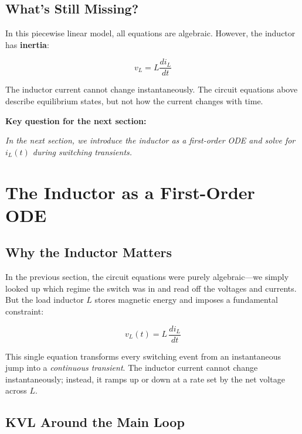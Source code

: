 \documentclass[11pt, a4paper]{article}
\begin{document}
\subsection{What's Still Missing?}

In this piecewise linear model, all equations are algebraic. However, the inductor has \textbf{inertia}:

\[
    v_L = L \frac{di_L}{dt}
\]

The inductor current cannot change instantaneously. The circuit equations above describe equilibrium states, but not how the current changes with time.

\vspace{1em}
\noindent\textbf{Key question for the next section:}


\vspace{1em}
\noindent\textit{In the next section, we introduce the inductor as a first-order ODE and solve for $i_L(t)$ during switching transients.}

\section{The Inductor as a First-Order ODE}

\subsection{Why the Inductor Matters}

In the previous section, the circuit equations were purely algebraic—we simply looked up which regime the switch was in and read off the voltages and currents. But the load inductor $L$ stores magnetic energy and imposes a fundamental constraint:

\[
    v_L(t) = L\,\frac{di_L}{dt}
\]

This single equation transforms every switching event from an instantaneous jump into a \emph{continuous transient}. The inductor current cannot change instantaneously; instead, it ramps up or down at a rate set by the net voltage across $L$.

\subsection{KVL Around the Main Loop}
\end{document}
